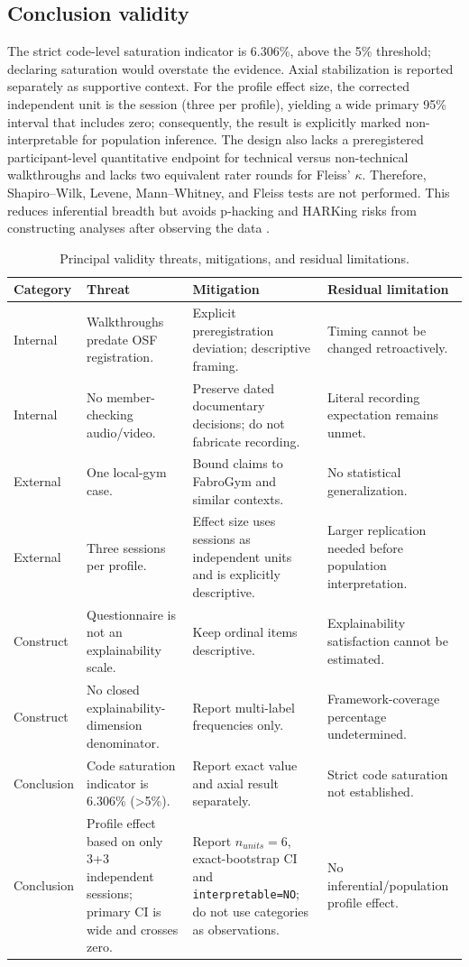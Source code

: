 \documentclass[pdflatex,sn-basic]{sn-jnl}
\begin{document}
\subsection{Conclusion validity}
The strict code-level saturation indicator is 6.306\%, above the 5\% threshold; declaring saturation would overstate the evidence. Axial stabilization is reported separately as supportive context. For the profile effect size, the corrected independent unit is the session (three per profile), yielding a wide primary 95\% interval that includes zero; consequently, the result is explicitly marked non-interpretable for population inference. The design also lacks a preregistered participant-level quantitative endpoint for technical versus non-technical walkthroughs and lacks two equivalent rater rounds for Fleiss' $\kappa$. Therefore, Shapiro--Wilk, Levene, Mann--Whitney, and Fleiss tests are not performed. This reduces inferential breadth but avoids p-hacking and HARKing risks from constructing analyses after observing the data \cite{simmons2011,kerr1998}.

\begin{table}[H]
\caption{Principal validity threats, mitigations, and residual limitations.}\label{tab:validity}
\centering\small
\begin{tabularx}{\textwidth}{@{}p{2.0cm}X X X@{}}
\toprule
Category & Threat & Mitigation & Residual limitation \\
\midrule
Internal & Walkthroughs predate OSF registration. & Explicit preregistration deviation; descriptive framing. & Timing cannot be changed retroactively.\\
Internal & No member-checking audio/video. & Preserve dated documentary decisions; do not fabricate recording. & Literal recording expectation remains unmet.\\
External & One local-gym case. & Bound claims to FabroGym and similar contexts. & No statistical generalization.\\
External & Three sessions per profile. & Effect size uses sessions as independent units and is explicitly descriptive. & Larger replication needed before population interpretation.\\
Construct & Questionnaire is not an explainability scale. & Keep ordinal items descriptive. & Explainability satisfaction cannot be estimated.\\
Construct & No closed explainability-dimension denominator. & Report multi-label frequencies only. & Framework-coverage percentage undetermined.\\
Conclusion & Code saturation indicator is 6.306\% (>5\%). & Report exact value and axial result separately. & Strict code saturation not established.\\
Conclusion & Profile effect based on only 3+3 independent sessions; primary CI is wide and crosses zero. & Report $n_{units}=6$, exact-bootstrap CI and \texttt{interpretable=NO}; do not use categories as observations. & No inferential/population profile effect.\\
\bottomrule
\end{tabularx}
\end{table}
\end{document}
